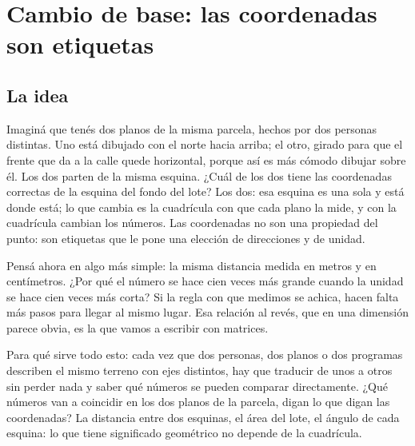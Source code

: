 \chapter{Cambio de base: las coordenadas son etiquetas}\label{cap:cambio-base}

\section{La idea}

Imaginá que tenés dos planos de la misma parcela, hechos por dos personas distintas. Uno está
dibujado con el norte hacia arriba; el otro, girado para que el frente que da a la calle quede
horizontal, porque así es más cómodo dibujar sobre él. Los dos parten de la misma esquina.
¿Cuál de los dos tiene las coordenadas correctas de la esquina del fondo del lote?
Los dos: esa esquina es una sola y está donde está; lo que cambia es la cuadrícula con que cada
plano la mide, y con la cuadrícula cambian los números. Las coordenadas no son una propiedad
del punto: son etiquetas que le pone una elección de direcciones y de unidad.

Pensá ahora en algo más simple: la misma distancia medida en metros y en centímetros. ¿Por qué
el número se hace cien veces más grande cuando la unidad se hace cien veces más corta? Si la
regla con que medimos se achica, hacen falta más pasos para llegar al mismo lugar. Esa relación
al revés, que en una dimensión parece obvia, es la que vamos a escribir con matrices.

Para qué sirve todo esto: cada vez que dos personas, dos planos o dos programas describen el
mismo terreno con ejes distintos, hay que traducir de unos a otros sin perder nada y saber qué
números se pueden comparar directamente. ¿Qué números van a coincidir en los dos planos de la
parcela, digan lo que digan las coordenadas? La distancia entre dos esquinas, el área del lote,
el ángulo de cada esquina: lo que tiene significado geométrico no depende de la cuadrícula.

